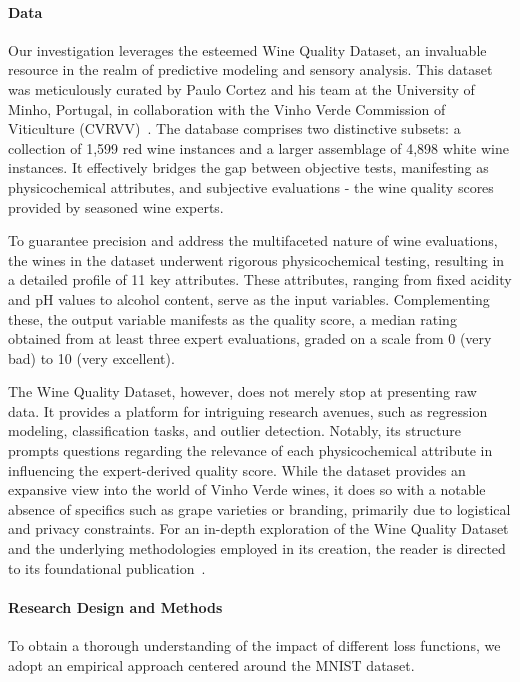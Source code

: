 \documentclass[12pt]{article}
\begin{document}
\paragraph{Data}
Our investigation leverages the esteemed Wine Quality Dataset, an invaluable resource in the realm of predictive modeling and sensory analysis. This dataset was meticulously curated by Paulo Cortez and his team at the University of Minho, Portugal, in collaboration with the Vinho Verde Commission of Viticulture (CVRVV)~\citep{wine_quality_source}. The database comprises two distinctive subsets: a collection of 1,599 red wine instances and a larger assemblage of 4,898 white wine instances. It effectively bridges the gap between objective tests, manifesting as physicochemical attributes, and subjective evaluations - the wine quality scores provided by seasoned wine experts.

To guarantee precision and address the multifaceted nature of wine evaluations, the wines in the dataset underwent rigorous physicochemical testing, resulting in a detailed profile of 11 key attributes. These attributes, ranging from fixed acidity and pH values to alcohol content, serve as the input variables. Complementing these, the output variable manifests as the quality score, a median rating obtained from at least three expert evaluations, graded on a scale from 0 (very bad) to 10 (very excellent).

The Wine Quality Dataset, however, does not merely stop at presenting raw data. It provides a platform for intriguing research avenues, such as regression modeling, classification tasks, and outlier detection. Notably, its structure prompts questions regarding the relevance of each physicochemical attribute in influencing the expert-derived quality score. While the dataset provides an expansive view into the world of Vinho Verde wines, it does so with a notable absence of specifics such as grape varieties or branding, primarily due to logistical and privacy constraints. For an in-depth exploration of the Wine Quality Dataset and the underlying methodologies employed in its creation, the reader is directed to its foundational publication~\citep{wine_quality_source}.

\paragraph{Research Design and Methods}
To obtain a thorough understanding of the impact of different loss functions, we adopt an empirical approach centered around the MNIST dataset.
\end{document}
